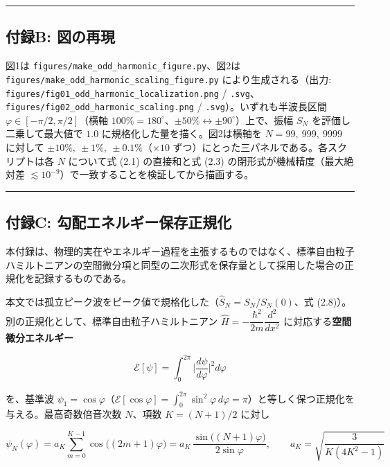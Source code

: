 \documentclass[
]{ltjsarticle}
\begin{document}
\begin{center}\rule{0.5\linewidth}{0.5pt}\end{center}

\subsection{付録B:
図の再現}\label{ux4ed8ux9332b-ux56f3ux306eux518dux73fe}

図1は \texttt{figures/make\_odd\_harmonic\_figure.py}、図2は
\texttt{figures/make\_odd\_harmonic\_scaling\_figure.py}
により生成される（出力:
\texttt{figures/fig01\_odd\_harmonic\_localization.png} /
\texttt{.svg}、\texttt{figures/fig02\_odd\_harmonic\_scaling.png} /
\texttt{.svg}）。いずれも半波長区間 \(\varphi\in[-\pi/2,\pi/2]\)（横軸
\(100\%=180^\circ\)、\(\pm50\%\leftrightarrow\pm90^\circ\)）上で、振幅
\(S_N\) を評価し二乗して最大値で \(1.0\)
に規格化した量を描く。図2は横軸を \(N=99,\ 999,\ 9999\) に対して
\(\pm10\%,\ \pm1\%,\ \pm0.1\%\)（\(\times 10\)
ずつ）にとった三パネルである。各スクリプトは各 \(N\) について式 (2.1)
の直接和と式 (2.3) の閉形式が機械精度（最大絶対差
\(\lesssim 10^{-9}\)）で一致することを検証してから描画する。

\begin{center}\rule{0.5\linewidth}{0.5pt}\end{center}

\subsection{付録C:
勾配エネルギー保存正規化}\label{ux4ed8ux9332c-ux52feux914dux30a8ux30cdux30ebux30aeux30fcux4fddux5b58ux6b63ux898fux5316}

本付録は、物理的実在やエネルギー過程を主張するものではなく、標準自由粒子ハミルトニアンの空間微分項と同型の二次形式を保存量として採用した場合の正規化を記録するものである。

本文では孤立ピーク波をピーク値で規格化した（\(\widehat{S}_N=S_N/S_N(0)\)、式
(2.8)）。別の正規化として、標準自由粒子ハミルトニアン
\(\hat H=-\dfrac{\hbar^2}{2m}\dfrac{d^2}{dx^2}\)
に対応する\textbf{空間微分エネルギー}

\[
\mathcal{E}[\psi]=\int_0^{2\pi}\Big|\frac{d\psi}{d\varphi}\Big|^2 d\varphi
\]

を、基準波
\(\psi_1=\cos\varphi\)（\(\mathcal{E}[\cos\varphi]=\int_0^{2\pi}\sin^2\varphi\,d\varphi=\pi\)）と等しく保つ正規化を与える。最高奇数倍音次数
\(N\)、項数 \(K=(N+1)/2\) に対し

\[
\psi_N(\varphi)=a_K\sum_{m=0}^{K-1}\cos\!\big((2m+1)\varphi\big)
=a_K\,\frac{\sin\!\big((N+1)\varphi\big)}{2\sin\varphi},
\qquad
a_K=\sqrt{\frac{3}{K(4K^2-1)}}
\]
\end{document}

